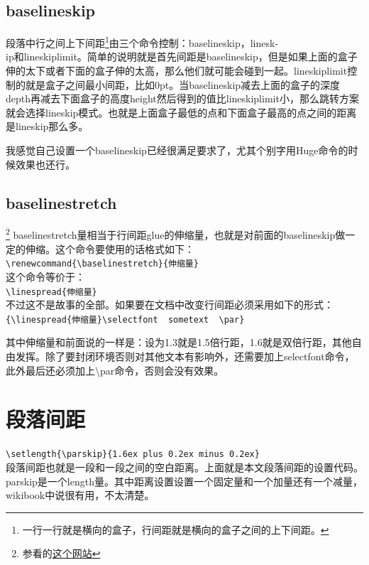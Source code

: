 \documentclass[11pt,oneside]{book}
\begin{document}
\subsection{baselineskip} 
段落中行之间上下间距\footnote{一行一行就是横向的盒子，行间距就是横向的盒子之间的上下间距。}由三个命令控制：baselineskip，linesk-\\ip和lineskiplimit。简单的说明就是首先间距是baselineskip，但是如果上面的盒子伸的太下或者下面的盒子伸的太高，那么他们就可能会碰到一起。lineskiplimit控制的就是盒子之间最小间距，比如0pt。当baselineskip减去上面的盒子的深度depth再减去下面盒子的高度height然后得到的值比lineskiplimit小，那么跳转方案就会选择lineskip模式。也就是上面盒子最低的点和下面盒子最高的点之间的距离是lineskip那么多。

我感觉自己设置一个baselineskip已经很满足要求了，尤其个别字用Huge命令的时候效果也还行。


\subsection{baselinestretch}\footnote{参看的\href{http://tex.stackexchange.com/questions/49596/no-effect-of-baselinestretch}{这个网站}}
baselinestretch量相当于行间距glue的伸缩量，也就是对前面的baselineskip做一定的伸缩。这个命令要使用的话格式如下：\\
\verb+\renewcommand{\baselinestretch}{伸缩量}+\\
这个命令等价于：\\
\verb+\linespread{伸缩量}+\\
不过这不是故事的全部。如果要在文档中改变行间距必须采用如下的形式：\\
\verb+{\linespread{伸缩量}\selectfont  sometext  \par}+

{\linespread{3} \selectfont 其中伸缩量和前面说的一样是：设为1.3就是1.5倍行距，1.6就是双倍行距，其他自由发挥。除了要封闭环境否则对其他文本有影响外，还需要加上selectfont命令，此外最后还必须加上\textbackslash par命令，否则会没有效果。\par}



\section{段落间距}
\verb+\setlength{\parskip}{1.6ex plus 0.2ex minus 0.2ex}+\\
段落间距也就是一段和一段之间的空白距离。上面就是本文段落间距的设置代码。parskip是一个length量。其中距离设置设置一个固定量和一个加量还有一个减量，wikibook中说很有用，不太清楚。
\end{document}
